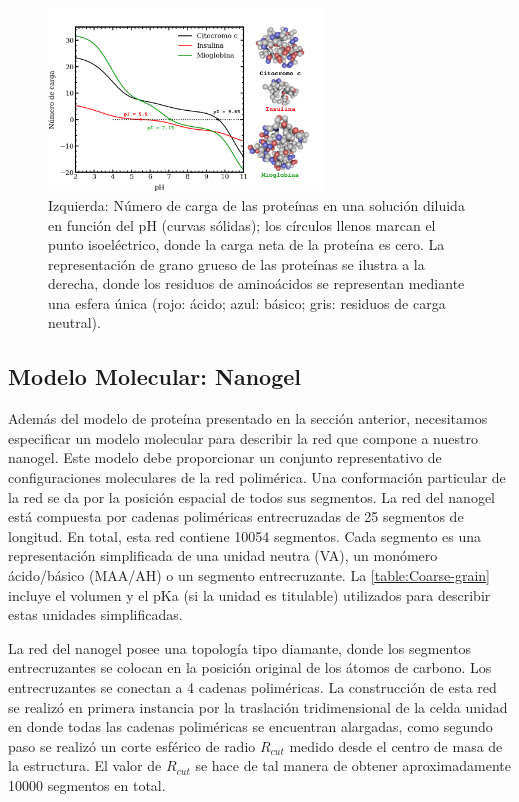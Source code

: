  \begin{figure}[!htb]
     \centering
     \includegraphics[width=0.65\textwidth]{Figures/graphs-gel2/protein-model.pdf}
     \caption{Izquierda: N\'umero de carga de las prote\'inas en una soluci\'on diluida en funci\'on del pH (curvas s\'olidas);
     	los c\'irculos llenos marcan el punto isoel\'ectrico,
     	donde la carga neta de la prote\'ina es cero.
     	La representaci\'on de grano grueso de las prote\'inas se ilustra a la derecha, donde los residuos de amino\'acidos se representan mediante una esfera \'unica (rojo: \'acido; azul: b\'asico; gris: residuos de carga neutral).}
     \label{fig:esf:protein-charge}
 \end{figure}



\subsection{Modelo Molecular: Nanogel}

Adem\'as del modelo de prote\'ina presentado en la secci\'on anterior, necesitamos especificar un modelo molecular para describir la red que compone a nuestro nanogel. Este modelo debe proporcionar un conjunto representativo de configuraciones moleculares de la red polim\'erica. Una conformaci\'on particular de la red se da por la posici\'on espacial de todos sus segmentos.
La red del nanogel est\'a compuesta por cadenas polim\'ericas entrecruzadas de 25 segmentos de longitud. En total, esta red contiene 10054 segmentos. Cada segmento es una representaci\'on simplificada de una unidad neutra (VA), un mon\'omero \'acido/b\'asico (MAA/AH) o un segmento entrecruzante. La \ref{table:Coarse-grain} incluye el volumen y el pKa (si la unidad es titulable) utilizados para describir estas unidades simplificadas.

La red del nanogel posee una topolog\'ia tipo diamante, donde los segmentos entrecruzantes se colocan en la posici\'on original de los \'atomos de carbono. Los entrecruzantes se conectan a 4 cadenas polim\'ericas. La construcci\'on de esta red se realiz\'o en primera instancia por la traslaci\'on tridimensional de la celda unidad en donde todas las cadenas polim\'ericas se encuentran alargadas, como segundo paso se realiz\'o un corte esf\'erico de radio $R_{cut}$ medido desde el centro de masa de la estructura. El valor de $R_{cut}$ se hace de tal manera de obtener aproximadamente 10000 segmentos en total. 

